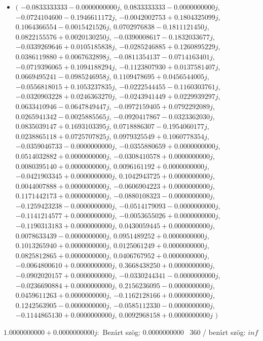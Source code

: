 \documentclass[14pt,a4paper]{article}
\begin{document}
\begin{itemize}
\item
$\big($
$-0.0833333333-0.0000000000j$, $0.0833333333-0.0000000000j$, $-0.0724104600-0.1946611172j$, $-0.0042002753+0.1804325099j$, $0.1064366554-0.0015421526j$, $0.0702976838-0.1811121450j$, $0.0822155576+0.0020130250j$, $-0.0390008617-0.1832033677j$, $-0.0339269646+0.0105185838j$, $-0.0285246885+0.1260895229j$, $0.0386119880+0.0067632898j$, $-0.0811354137-0.0714163401j$, $-0.0719396065+0.1094188294j$, $-0.1123807930+0.0137581407j$, $0.0669495241-0.0985246958j$, $0.1109478695+0.0456544005j$, $-0.0556818015+0.1053237835j$, $-0.0222544455-0.1160303761j$, $-0.0320903228+0.0246363270j$, $-0.0243941449+0.0229939297j$, $0.0633410946-0.0647849447j$, $-0.0972159405+0.0792292089j$, $0.0265941342-0.0025885565j$, $-0.0920417867-0.0323362030j$, $0.0835039147+0.1693103395j$, $0.0718886307-0.1954060177j$, $0.0238865118+0.0725707825j$, $0.0979325549+0.1060778354j$, $-0.0359046733-0.0000000000j$, $-0.0355880659+0.0000000000j$, $0.0514032882+0.0000000000j$, $-0.0308410578+0.0000000000j$, $0.0080395140+0.0000000000j$, $0.0096161192+0.0000000000j$, $-0.0421903345+0.0000000000j$, $0.1042943725+0.0000000000j$, $0.0044007888+0.0000000000j$, $-0.0606904223+0.0000000000j$, $0.1171442173+0.0000000000j$, $-0.0880108323-0.0000000000j$, $-0.1259423238-0.0000000000j$, $-0.0514179093-0.0000000000j$, $-0.1141214577+0.0000000000j$, $-0.0053655026+0.0000000000j$, $-0.1190313183+0.0000000000j$, $0.0430059445+0.0000000000j$, $0.0078633439-0.0000000000j$, $0.0951489252+0.0000000000j$, $0.1013265940+0.0000000000j$, $0.0125061249+0.0000000000j$, $0.0825812865+0.0000000000j$, $0.0406767952+0.0000000000j$, $-0.0064800610+0.0000000000j$, $0.3668438250+0.0000000000j$, $-0.0902020157+0.0000000000j$, $-0.0330244341-0.0000000000j$, $-0.0236690884+0.0000000000j$, $0.2156236095-0.0000000000j$, $0.0459611263+0.0000000000j$, $-0.1162128166+0.0000000000j$, $0.1242563905-0.0000000000j$, $-0.0585112330-0.0000000000j$, $-0.1144865130+0.0000000000j$, $0.0092968158+0.0000000000j$
$\big)$
\end{itemize}
$1.0000000000+0.0000000000j$:\
Bezárt szög: $0.0000000000$ \
360 / bezárt szög: $inf$\
\end{document}
